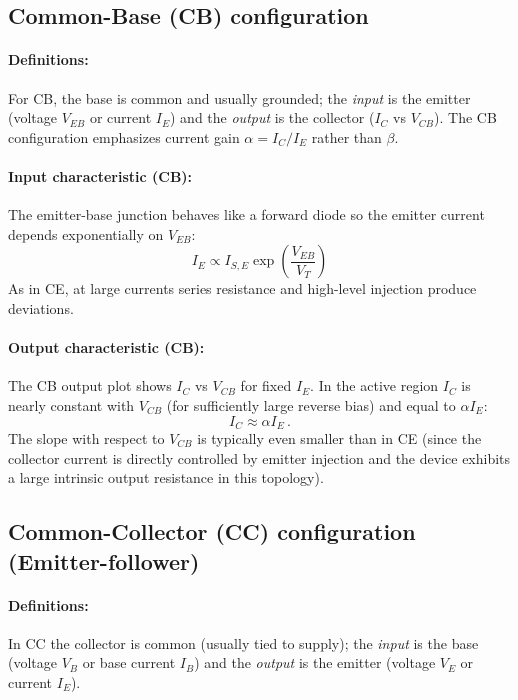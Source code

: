 \documentclass[12pt,a4paper]{article}
\begin{document}
\subsection{Common-Base (CB) configuration}
\paragraph{Definitions:}
For CB, the base is common and usually grounded; the \emph{input} is the emitter (voltage $V_{EB}$ or current $I_E$) and the \emph{output} is the collector ($I_C$ vs $V_{CB}$). The CB configuration emphasizes current gain $\alpha = I_C/I_E$ rather than $\beta$.

\paragraph{Input characteristic (CB):}
The emitter-base junction behaves like a forward diode so the emitter current depends exponentially on $V_{EB}$:
\begin{equation}
  I_E \propto I_{S,E}\exp\left(\frac{V_{EB}}{V_T}\right)\label{eq:ie_veb}
\end{equation}
As in CE, at large currents series resistance and high-level injection produce deviations.

\paragraph{Output characteristic (CB):}
The CB output plot shows $I_C$ vs $V_{CB}$ for fixed $I_E$. In the active region $I_C$ is nearly constant with $V_{CB}$ (for sufficiently large reverse bias) and equal to $\alpha I_E$:
\begin{equation}
  I_C \approx \alpha I_E\,.
\end{equation}
The slope with respect to $V_{CB}$ is typically even smaller than in CE (since the collector current is directly controlled by emitter injection and the device exhibits a large intrinsic output resistance in this topology).


\subsection{Common-Collector (CC) configuration (Emitter-follower)}
\paragraph{Definitions:}
In CC the collector is common (usually tied to supply); the \emph{input} is the base (voltage $V_{B}$ or base current $I_B$) and the \emph{output} is the emitter (voltage $V_E$ or current $I_E$).
\end{document}
